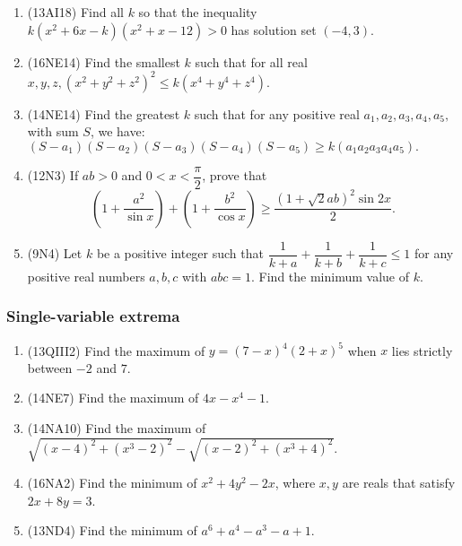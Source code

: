 \documentclass[10pt,paper=letter]{scrartcl}
\begin{document}
\begin{enumerate}

\item (13AI18) Find all $k$ so that the inequality $k(x^2+6x-k)(x^2+x-12) > 0$ has solution set $(-4, 3)$.

\item (16NE14) Find the smallest $k$ such that for all real $x, y, z, (x^2+y^2+z^2)^2 \leq k(x^4 +y^4 + z^4)$.

\item (14NE14) Find the greatest $k$ such that for any positive real $a_1, a_2, a_3, a_4, a_5,$ with sum $S$, we have: $(S-a_1)(S-a_2)(S-a_3)(S-a_4)(S-a_5) \geq k(a_1a_2a_3a_4a_5).$

\item (12N3) If $ab > 0$ and $0 < x < \dfrac{\pi}{2}$, prove that $$\left(1 + \frac{a^2}{\sin x}\right) + \left(1 + \frac{b^2}{\cos x}\right) \geq \frac{(1+\sqrt{2}ab)^2\sin 2x}{2}.$$

\item (9N4) Let $k$ be a positive integer such that $\dfrac{1}{k+a} + \dfrac{1}{k+b} + \dfrac{1}{k+c} \leq 1$ for any positive real numbers $a, b, c$ with $abc = 1$. Find the minimum value of $k$.

\end{enumerate}

\subsubsection*{Single-variable extrema}

\begin{enumerate}

\item (13QIII2) Find the maximum of $y = (7 - x)^4(2+x)^5$ when $x$ lies strictly between $-2$ and $7$.

\item (14NE7) Find the maximum of $4x - x^4 - 1$.

\item (14NA10) Find the maximum of $\sqrt{(x-4)^2 + (x^3-2)^2} - \sqrt{(x-2)^2 + (x^3+4)^2}$.

\item (16NA2) Find the minimum of $x^2 + 4y^2 - 2x$, where $x, y$ are reals that satisfy $2x + 8y = 3$.

\item (13ND4) Find the minimum of $a^6 + a^4 - a^3 - a + 1$.

\end{enumerate}
\end{document}
